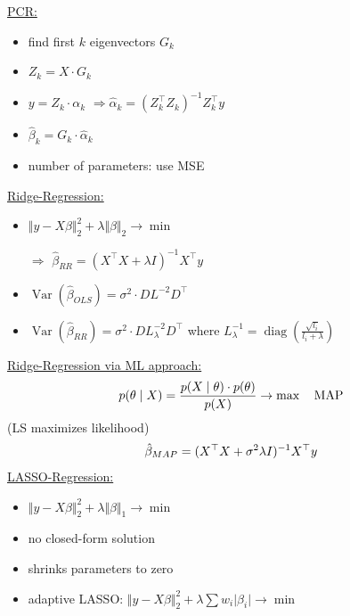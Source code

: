 \documentclass[10pt,landscape,a4paper]{article}
\DeclareMathOperator{\Var}{Var}
\DeclareMathOperator{\diag}{diag}
\begin{document}
\begin{multicols*}{4}
\underline{PCR:}
\begin{itemize}
	\item find first $k$ eigenvectors $G_k$
	\item $Z_k = X\cdot G_k$
	\item $y = Z_k\cdot \alpha_k$ $\Rightarrow \hat{\alpha}_k = (Z_k^\top Z_k)^{-1}Z_k^\top y$
	\item $\hat{\beta}_k = G_k\cdot\hat{\alpha}_k$
	\item number of parameters: use MSE
\end{itemize}
\underline{Ridge-Regression:}
\begin{itemize}
	\item $\Vert y-X\beta\Vert_2^2 + \lambda\Vert\beta\Vert_2\to\min$
	\item[$\Rightarrow$] $\hat{\beta}_{RR} = (X^\top X + \lambda I)^{-1}X^\top y$
	\item $\Var(\hat{\beta}_{OLS}) = \sigma^2\cdot DL^{-2}D^\top$
	\item $\Var(\hat{\beta}_{RR}) = \sigma^2\cdot DL_{\lambda}^{-2}D^\top$ where $L^{-1}_{\lambda} = \diag\left(\frac{\sqrt{l_i}}{l_i + \lambda}\right)$
\end{itemize}
\underline{Ridge-Regression via ML approach:}
\begin{align}
	p(\theta\mid X) = \frac{p(X\mid \theta) \cdot p(\theta)}{p(X)} \to\max\quad\text{MAP} \notag
\end{align}
(LS maximizes likelihood)
\begin{align}
	\hat{\beta}_{MAP} = (X^\top X + \sigma^2\lambda I)^{-1}X^\top y \notag
\end{align}
\underline{LASSO-Regression:}
\begin{itemize}
	\item $\Vert y-X\beta\Vert_2^2 + \lambda\Vert\beta\Vert_1\to\min$
	\item no closed-form solution
	\item shrinks parameters to zero
	\item adaptive LASSO: $\Vert y-X\beta\Vert_2^2 + \lambda\sum w_i\vert\beta_i\vert\to\min$
\end{itemize}


\end{multicols*}
\end{document}
